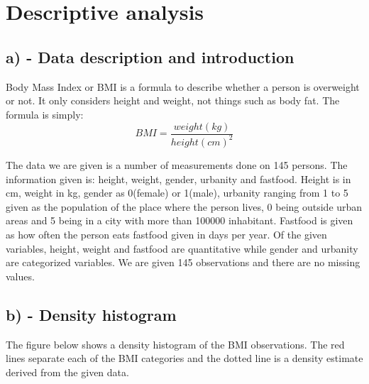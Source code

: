 \documentclass{memoir}
\begin{document}
\newpage
\begin{KeepFromToc}
	\tableofcontents 
	\thispagestyle{empty}
\end{KeepFromToc}
\newpage


\chapter{\\ Descriptive analysis}

\section{a) - Data description and introduction}
Body Mass Index or BMI is a formula to describe whether a person is overweight or not. It only considers height and weight, not things such as body fat. The formula is simply: 
$$ BMI = \frac{weight(kg)}{height(cm)^2}$$

The data we are given is a number of measurements done on 145 persons. The information given is: height, weight, gender, urbanity and fastfood. Height is in cm, weight in kg, gender as 0(female) or 1(male), urbanity ranging from 1 to 5 given as the population of the place where the person lives, 0 being outside urban areas and 5 being in a city with more than 100000 inhabitant. Fastfood is given as how often the person eats fastfood given in days per year. 
Of the given variables, height, weight and fastfood are quantitative while gender and urbanity are categorized variables. We are given 145 observations and there are no missing values.

\section{b) - Density histogram}
The figure below shows a density histogram of the BMI observations. The red lines separate each of the BMI categories and the dotted line is a density estimate derived from the given data. 
\end{document}
